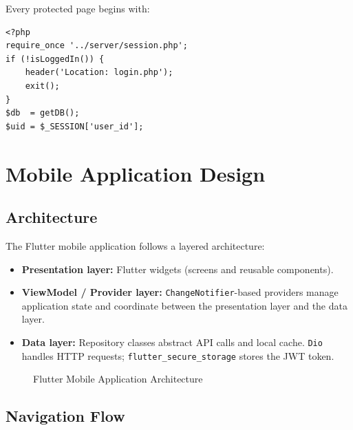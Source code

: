 \documentclass[12pt,a4paper,openright]{report}
\begin{document}
Every protected page begins with:
\begin{lstlisting}[style=phpstyle, caption={Standard Page Access Guard}]
<?php
require_once '../server/session.php';
if (!isLoggedIn()) {
    header('Location: login.php');
    exit();
}
$db  = getDB();
$uid = $_SESSION['user_id'];
\end{lstlisting}

\section{Mobile Application Design}

\subsection{Architecture}

The Flutter mobile application follows a layered architecture:

\begin{itemize}[noitemsep]
    \item \textbf{Presentation layer:} Flutter widgets (screens and reusable components).
    \item \textbf{ViewModel / Provider layer:} \texttt{ChangeNotifier}-based providers manage application state and coordinate between the presentation layer and the data layer.
    \item \textbf{Data layer:} Repository classes abstract API calls and local cache. \texttt{Dio} handles HTTP requests; \texttt{flutter\_secure\_storage} stores the JWT token.
\end{itemize}

\begin{figure}[H]
\centering
{}
\caption{Flutter Mobile Application Architecture}
\label{fig:flutter-arch}
\end{figure}

\subsection{Navigation Flow}
\end{document}
